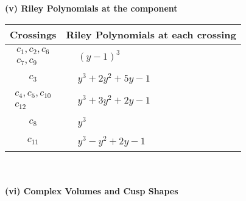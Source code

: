 \documentclass[1p]{elsarticle_modified}
\theoremstyle{definition}
\begin{document}
\newpage\renewcommand{\arraystretch}{1}
\flushleft \textbf{(v) Riley Polynomials at the component}\newline \\
\begin{tabular}{m{50pt}|m{274pt}}
Crossings & \hspace{64pt}Riley Polynomials at each crossing \\
\hline $$\begin{aligned}c_{1},c_{2},c_{6}\\c_{7},c_{9}\end{aligned}$$&$\begin{aligned}
&(y-1)^3
\end{aligned}$\\
\hline $$\begin{aligned}c_{3}\end{aligned}$$&$\begin{aligned}
&y^3+2 y^2+5 y-1
\end{aligned}$\\
\hline $$\begin{aligned}c_{4},c_{5},c_{10}\\c_{12}\end{aligned}$$&$\begin{aligned}
&y^3+3 y^2+2 y-1
\end{aligned}$\\
\hline $$\begin{aligned}c_{8}\end{aligned}$$&$\begin{aligned}
&y^3
\end{aligned}$\\
\hline $$\begin{aligned}c_{11}\end{aligned}$$&$\begin{aligned}
&y^3- y^2+2 y-1
\end{aligned}$\\
\hline
\end{tabular}\\~\\
\newpage\flushleft \textbf{(vi) Complex Volumes and Cusp Shapes}
\end{document}
